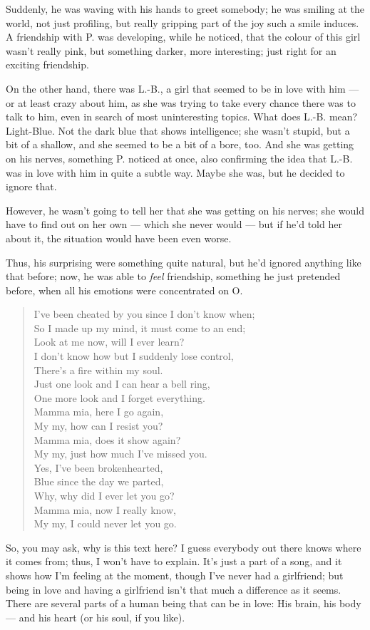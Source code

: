 Suddenly, he was waving with his hands to greet somebody; he was smiling at the world, not just profiling, but really gripping part of the joy such a smile induces. A friendship with P. was developing, while he noticed, that the colour of this girl wasn't really pink, but something darker, more interesting; just right for an exciting friendship.

On the other hand, there was L.-B., a girl that seemed to be in love with him --- or at least crazy about him, as she was trying to take every chance there was to talk to him, even in search of most uninteresting topics. 
What does L.-B. mean? Light-Blue. Not the dark blue that shows intelligence; she wasn't stupid, but a bit of a shallow, and she seemed to be a bit of a bore, too. 
And she was getting on his nerves, something P. noticed at once, also confirming the idea that L.-B. was in love with him in quite a subtle way. 
Maybe she was, but he decided to ignore that.

However, he wasn't going to tell her that she was getting on his nerves; she would have to find out on her own --- which she never would --- but if he'd told her about it, the situation would have been even worse.

Thus, his surprising were something quite natural, but he'd ignored anything like that before; now, he was able to \emph{feel} friendship, something he just pretended before, when all his emotions were concentrated on O. 
\begin{verse}
I've been cheated by you since I don't know when;\\
So I made up my mind, it must come to an end;\\
Look at me now, will I ever learn? \\
I don't know how but I suddenly lose control,\\
There's a fire within my soul. \\
Just one look and I can hear a bell ring,\\
One more look and I forget everything. \\

Mamma mia, here I go again,\\
My my, how can I resist you? \\
Mamma mia, does it show again?\\
My my, just how much I've missed you. \\
Yes, I've been brokenhearted, \\
Blue since the day we parted, \\
Why, why did I ever let you go? \\
Mamma mia, now I really know,\\
My my, I could never let you go.
\end{verse}
So, you may ask, why is this text here? I guess everybody out there knows where it comes from; thus, I won't have to explain. 
It's just a part of a song, and it shows how I'm feeling at the moment, though I've never had a girlfriend; but being in love and having a girlfriend isn't that much a difference as it seems. There are several parts of a human being that can be in love: His brain, his body --- and his heart (or his soul, if you like).

